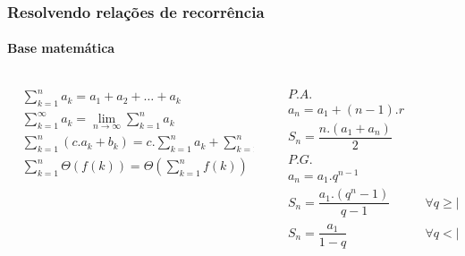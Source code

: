 \begin{frame}
	\frametitle{Resolvendo relações de recorrência}
	\framesubtitle{Base matemática}
	\begin{columns}
		\begin{column}{0.55\textwidth}
			\begin{equation}
				\begin{aligned} 
					&\sum_{k=1}^{n} a_k = a_1 + a_2 + \dots + a_k\\
					&\sum_{k=1}^{\infty} a_k = \lim\limits_{n \to \infty} \sum_{k=1}^{n} a_k\\
					&\sum_{k=1}^{n} (c.a_k + b_k) = c.\sum_{k=1}^{n} a_k + \sum_{k=1}^{n} b_k\\
					&\sum_{k=1}^{n} \Theta(f(k)) = \Theta\left(	\sum_{k=1}^{n} f(k)\right)
				\end{aligned}
			\end{equation}
		\end{column}
		\begin{column}{0.45\textwidth}
			\begin{equation}
				\begin{aligned}
					&P.A.\\ 
					&a_n = a_1 + (n-1).r\\
					&S_n = \dfrac{n.(a_1 + a_n)}{2}\\
					&P.G.\\
					&a_n = a_1.q^{n-1}\\
					&S_n = \dfrac{a_1.(q^n-1)}{q-1} \qquad &\forall q \geq |1|\\
					&S_n = \dfrac{a_1}{1-q} \qquad &\forall q < |1|
				\end{aligned}
			\end{equation}
		\end{column}
	\end{columns}
\end{frame}

